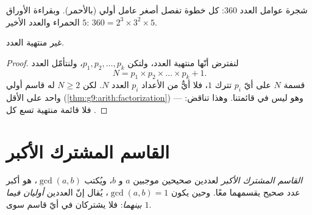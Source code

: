 \begin{omfigure}

{\small شجرة عوامل العدد $360$: كل خطوة تفصل أصغر عامل أولي
(بالأحمر). وبقراءة الأوراق الحمراء والعدد الأخير $5$:
$360 = 2^3 \times 3^2 \times 5$.}
\end{omfigure}

\begin{theorem}[إقليدس]\label{thm:g9:arith:euclid}
 غير منتهية العدد.
\end{theorem}

\begin{proof}
لنفترض أنّها منتهية العدد، ولتكن $p_1, p_2, \dots, p_k$، ولنتأمّل
العدد
\[
N = p_1 \times p_2 \times \dots \times p_k + 1 .
\]
قسمة $N$ على أيّ $p_i$ تترك  $1$، فلا  أيٌّ من
الأعداد $p_i$ العدد $N$. لكن $N \geq 2$ له قاسم أولي واحد على
الأقل (\cref{thm:g9:arith:factorization}) --- وهو  ليس في
قائمتنا. وهذا تناقض: فلا قائمة منتهية تسع كل .
\end{proof}

\section{القاسم المشترك الأكبر}

\begin{definition}\label{def:g9:arith:gcd}
\emph{القاسم المشترك الأكبر} لعددين صحيحين
موجبين $a$ و $b$، ويُكتب $\gcd(a, b)$، هو أكبر عدد صحيح يقسمهما
معًا. وحين يكون $\gcd(a, b) = 1$، يُقال إنّ العددين \emph{أوليان
فيما بينهما}: فلا يشتركان في أيّ
قاسم سوى $1$.
\end{definition}

